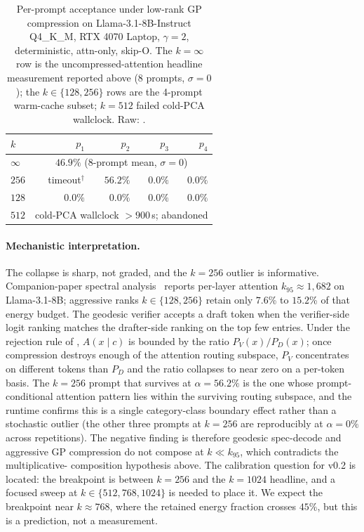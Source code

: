 \documentclass[11pt]{article}
\begin{document}
\begin{table}[h]\centering\small
\caption{Per-prompt acceptance under low-rank GP compression on
Llama-3.1-8B-Instruct Q4\_K\_M, RTX 4070 Laptop, $\gamma{=}2$,
deterministic, attn-only, skip-O. The $k{=}\infty$ row is the
uncompressed-attention headline measurement reported above
(8 prompts, $\sigma{=}0$); the $k{\in}\{128, 256\}$ rows are the
4-prompt warm-cache subset; $k{=}512$ failed cold-PCA wallclock.
Raw: \protect{}.}
\label{tab:accept-collapse}
\begin{tabular}{@{}lrrrr@{}}
\toprule
$k$ & $p_1$ & $p_2$ & $p_3$ & $p_4$ \\
\midrule
$\infty$ & \multicolumn{4}{c}{$46.9\%$ (8-prompt mean, $\sigma{=}0$)} \\
$256$ & timeout$^\dagger$ & $\mathbf{56.2\%}$ & $0.0\%$ & $0.0\%$ \\
$128$ & $0.0\%$ & $0.0\%$ & $0.0\%$ & $0.0\%$ \\
$512$ & \multicolumn{4}{c}{cold-PCA wallclock $>900$\,s; abandoned} \\
\bottomrule
\end{tabular}
\end{table}

\paragraph{Mechanistic interpretation.} The collapse is sharp, not
graded, and the $k{=}256$ outlier is informative. Companion-paper
spectral analysis~\cite{stewart2026grc} reports per-layer attention
$k_{95}{\approx}1{,}682$ on Llama-3.1-8B; aggressive ranks
$k\in\{128, 256\}$ retain only $7.6$\% to $15.2$\% of that energy budget.
The geodesic verifier accepts a draft token when the verifier-side
logit ranking matches the drafter-side ranking on the top few entries.
Under the rejection rule of , $A(x{\mid}c)$ is bounded
by the ratio $P_V(x)/P_D(x)$; once compression destroys enough of the
attention routing subspace, $P_V$ concentrates on different tokens
than $P_D$ and the ratio collapses to near zero on a per-token basis.
The $k{=}256$ prompt that survives at $\alpha{=}56.2\%$ is the one
whose prompt-conditional attention pattern lies within the surviving
routing subspace, and the runtime confirms this is a single
category-class boundary effect rather than a stochastic outlier (the
other three prompts at $k{=}256$ are reproducibly at $\alpha{=}0\%$
across repetitions). The negative finding is therefore
geodesic spec-decode and aggressive GP compression do not
compose at $k\ll k_{95}$, which contradicts the multiplicative-
composition hypothesis above. The calibration question for v0.2 is
located: the breakpoint is between $k{=}256$ and the $k{=}1024$
headline, and a focused sweep at $k\in\{512, 768, 1024\}$ is needed
to place it. We expect the breakpoint near $k\approx 768$, where the
retained energy fraction crosses $45$\%, but this is a prediction,
not a measurement.
\end{document}
